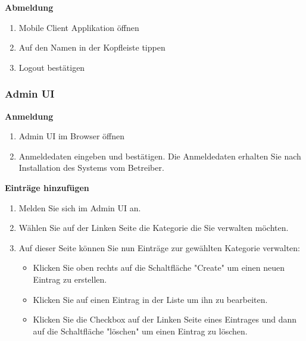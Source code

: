         \textbf{Abmeldung}

        \begin{enumerate}
            \item Mobile Client Applikation öffnen
            \item Auf den Namen in der Kopfleiste tippen
            \item Logout bestätigen
        \end{enumerate}

        \subsubsection*{Admin UI}

        \textbf{Anmeldung}

        \begin{enumerate}
            \item Admin UI im Browser öffnen
            \item Anmeldedaten eingeben und bestätigen. Die Anmeldedaten erhalten Sie nach Installation des Systems vom Betreiber.
        \end{enumerate}

        \textbf{Einträge hinzufügen}
        \begin{enumerate}
            \item Melden Sie sich im Admin UI an.
            \item Wählen Sie auf der Linken Seite die Kategorie die Sie verwalten möchten.
            \item Auf dieser Seite können Sie nun Einträge zur gewählten Kategorie verwalten:
            \begin{itemize}
                      \item Klicken Sie oben rechts auf die Schaltfläche "Create" um einen neuen Eintrag zu erstellen.
                      \item Klicken Sie auf einen Eintrag in der Liste um ihn zu bearbeiten.
                      \item Klicken Sie die Checkbox auf der Linken Seite eines Eintrages und dann auf die Schaltfläche "löschen" um einen Eintrag zu löschen.
            \end{itemize}
        \end{enumerate}

